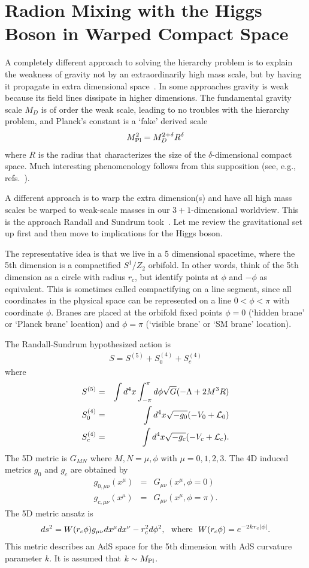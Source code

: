 \documentclass[12pt]{article}
\def\beq{\begin{eqnarray}}
\def\eeq{\end{eqnarray}}
\def\bea{\begin{eqnarray}}
\def\eea{\end{eqnarray}}
\def\xsection#1{\section{#1}}
\begin{document}
\xsection{Radion Mixing with the Higgs Boson in Warped Compact Space}

A completely different approach to solving the hierarchy problem is to explain the weakness of gravity not by an extraordinarily high mass scale, but by having it propagate in extra dimensional 
space~\cite{ArkaniHamed:1998rs,Antoniadis:1998ig}. In some approaches gravity is weak because its field lines dissipate in higher dimensions. The fundamental gravity scale $M_D$ is of order the weak scale, leading to no troubles with the hierarchy problem, and Planck's constant is a `fake' derived scale
\beq
M_{\rm Pl}^2=M_D^{2+\delta}R^\delta
\eeq
where $R$ is the radius that characterizes the size of the $\delta$-dimensional compact space. Much interesting phenomenology follows from this supposition (see, e.g., refs.~\cite{ArkaniHamed:1998nn,Giudice:1998ck,Hewett:2002hv,Kribs:2006mq}).
 
A different approach is to warp the extra dimension(s) and have all high mass scales be warped to weak-scale masses in our $3+1$-dimensional worldview. This is the approach Randall and Sundrum took~\cite{Randall:1999ee}. Let me review the gravitational set up first and then move to implications for the Higgs boson.

The representative idea is that we live in a 5 dimensional spacetime, where the 5th dimension is a compactified $S^1/Z_2$ orbifold. In other words, think of the 5th dimension as a circle with radius $r_c$, but identify points at $\phi$ and $-\phi$ as equivalent.   This is sometimes called compactifying on a line segment, since all coordinates in the physical space can be represented on a line $0<\phi<\pi$ with coordinate $\phi$.  Branes are placed at the orbifold fixed points $\phi=0$ (`hidden brane' or `Planck brane' location) and $\phi=\pi$ (`visible brane' or `SM brane' location).  

The Randall-Sundrum hypothesized action is
\beq
S=S^{(5)}+S^{(4)}_0+S^{(4)}_c
\eeq
where
\bea
S^{(5)} &=& \int d^4x \int_{-\pi}^{\pi} d\phi\sqrt{G}(-\Lambda+2M^3R) \\
S^{(4)}_{0}&=&\int d^4x \sqrt{-g_0}(-V_0+{\cal L}_0) \\
S^{(4)}_{c}&=&\int d^4x\sqrt{-g_c}(-V_c+{\cal L}_c).
\eeq
The 5D metric is $G_{MN}$ where $M,N=\mu,\phi$ with $\mu=0,1,2,3$. The 4D induced metrics $g_0$ and $g_c$ are obtained by
\bea
g_{0,\mu\nu}(x^\mu)&=&G_{\mu\nu}(x^\mu,\phi=0) \\
g_{c,\mu\nu}(x^\mu)&=&G_{\mu\nu}(x^\mu,\phi=\pi).
\eea
The 5D metric ansatz is 
\beq
ds^2=W(r_c\phi)g_{\mu\nu}dx^\mu dx^\nu-r_c^2d\phi^2,~~{\rm where}~~W(r_c\phi)=e^{-2kr_c|\phi|}.
\eeq
This metric describes an AdS space for the 5th dimension with AdS curvature parameter $k$.  It is assumed that $k\sim M_{\rm Pl}$.
\end{document}
